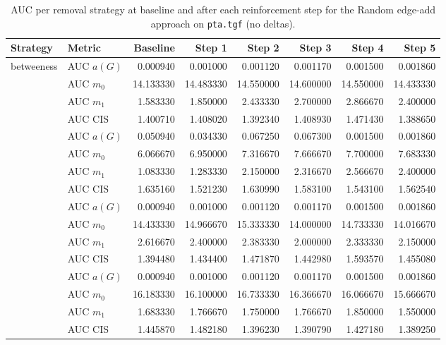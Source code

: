 \begin{table}[htbp]
  \centering
  \caption{AUC per removal strategy at baseline and after each reinforcement step for the Random edge-add approach on \texttt{pta.tgf} (no deltas).}
  \label{tab:pta-random_add-auc}
  \begin{tabular}{llrrrrrr}
    \toprule
    \textbf{Strategy} & \textbf{Metric} & \textbf{Baseline} & \textbf{Step 1} & \textbf{Step 2} & \textbf{Step 3} & \textbf{Step 4} & \textbf{Step 5} \\
    \midrule
    \multirow{4}{*}{betweeness} & AUC $a(G)$ & 0.000940 & 0.001000 & 0.001120 & 0.001170 & 0.001500 & 0.001860 \\
    & AUC $m_0$ & 14.133330 & 14.483330 & 14.550000 & 14.600000 & 14.550000 & 14.433330 \\
    & AUC $m_1$ & 1.583330 & 1.850000 & 2.433330 & 2.700000 & 2.866670 & 2.400000 \\
    & AUC CIS & 1.400710 & 1.408020 & 1.392340 & 1.408930 & 1.471430 & 1.388650 \\
    \addlinespace
    \multirow{4}{*}{closeness} & AUC $a(G)$ & 0.050940 & 0.034330 & 0.067250 & 0.067300 & 0.001500 & 0.001860 \\
    & AUC $m_0$ & 6.066670 & 6.950000 & 7.316670 & 7.666670 & 7.700000 & 7.683330 \\
    & AUC $m_1$ & 1.083330 & 1.283330 & 2.150000 & 2.316670 & 2.566670 & 2.400000 \\
    & AUC CIS & 1.635160 & 1.521230 & 1.630990 & 1.583100 & 1.543100 & 1.562540 \\
    \addlinespace
    \multirow{4}{*}{core influence} & AUC $a(G)$ & 0.000940 & 0.001000 & 0.001120 & 0.001170 & 0.001500 & 0.001860 \\
    & AUC $m_0$ & 14.433330 & 14.966670 & 15.333330 & 14.000000 & 14.733330 & 14.016670 \\
    & AUC $m_1$ & 2.616670 & 2.400000 & 2.383330 & 2.000000 & 2.333330 & 2.150000 \\
    & AUC CIS & 1.394480 & 1.434400 & 1.471870 & 1.442980 & 1.593570 & 1.455080 \\
    \addlinespace
    \multirow{4}{*}{degree} & AUC $a(G)$ & 0.000940 & 0.001000 & 0.001120 & 0.001170 & 0.001500 & 0.001860 \\
    & AUC $m_0$ & 16.183330 & 16.100000 & 16.733330 & 16.366670 & 16.066670 & 15.666670 \\
    & AUC $m_1$ & 1.683330 & 1.766670 & 1.750000 & 1.766670 & 1.850000 & 1.550000 \\
    & AUC CIS & 1.445870 & 1.482180 & 1.396230 & 1.390790 & 1.427180 & 1.389250 \\

\end{tabular}
\end{table}
